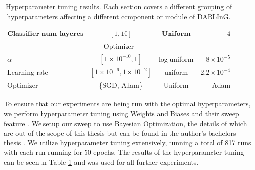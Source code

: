 \begin{table}
{\begin{tabular}{@{}lccr@{}}
		Classifier num layeres         & $[1, 10]$                              & Uniform            & $4$                  \\ \midrule
		\multicolumn{4}{c}{Optimizer}                                                                                       \\ \midrule
		$\alpha$                       & $[1 \times 10^{-10}, 1]$               & log uniform        & $8 \times 10^{-5}$   \\
		Learning rate                  & $[1 \times 10^{-6}, 1 \times 10^{-2}]$ & uniform            & $2.2 \times 10^{-4}$ \\
		Optimizer                      & \{SGD, Adam\}                          & Uniform            & Adam                 \\ \bottomrule
	\end{tabular}
	}
	\caption{Hyperparameter tuning results. Each section covers a different grouping of hyperparameters affecting a different component or module of DARLInG.}
	\label{tab:hpoptim-results}
\end{table}

To ensure that our experiments are being run with the optimal hyperparameters, we perform hyperparameter tuning using Weights and Biases and their sweep feature \cite{wandb}.
We setup our sweep to use Bayesian Optimization, the details of which are out of the scope of this thesis but can be found in the author's bachelors thesis \cite{satyawan2019semantic}.
We utilize hyperparameter tuning extensively, running a total of 817 runs with each run running for 50 epochs.
The results of the hyperparameter tuning can be seen in Table \ref{tab:hpoptim-results} and was used for all further experiments.

